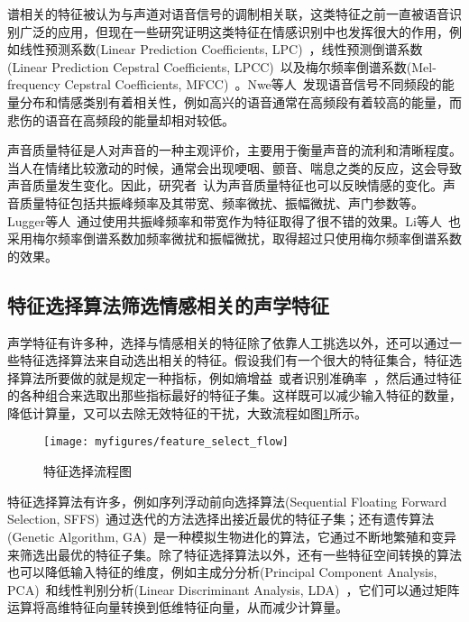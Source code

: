 谱相关的特征被认为与声道对语音信号的调制相关联，这类特征之前一直被语音识别广泛的应用，但现在一些研究证明这类特征在情感识别中也发挥很大的作用，例如线性预测系数(Linear Prediction Coefficients, LPC)~\cite{Ackroyd1997Digital}，线性预测倒谱系数(Linear Prediction Cepstral Coefficients, LPCC)~\cite{Atal1974Effectiveness}以及梅尔频率倒谱系数(Mel-frequency Cepstral Coefficients, MFCC)~\cite{Rabiner1999Fundamentals, Proakis1993Discrete}。Nwe等人~\cite{Nogueiras2012Speech}发现语音信号不同频段的能量分布和情感类别有着相关性，例如高兴的语音通常在高频段有着较高的能量，而悲伤的语音在高频段的能量却相对较低。

声音质量特征是人对声音的一种主观评价，主要用于衡量声音的流利和清晰程度。当人在情绪比较激动的时候，通常会出现哽咽、颤音、喘息之类的反应，这会导致声音质量发生变化。因此，研究者~\cite{Gobl2003The}认为声音质量特征也可以反映情感的变化。声音质量特征包括共振峰频率及其带宽、频率微扰、振幅微扰、声门参数等。Lugger等人~\cite{Lugger2007The, Lugger2008Psychological, Lugger2015Combining}通过使用共振峰频率和带宽作为特征取得了很不错的效果。Li等人~\cite{Li2007Stress}也采用梅尔频率倒谱系数加频率微扰和振幅微扰，取得超过只使用梅尔频率倒谱系数的效果。

\subsection{特征选择算法筛选情感相关的声学特征}
\label{ssec:algorithm_select}
声学特征有许多种，选择与情感相关的特征除了依靠人工挑选以外，还可以通过一些特征选择算法来自动选出相关的特征。假设我们有一个很大的特征集合，特征选择算法所要做的就是规定一种指标，例如熵增益~\cite{Dhillon2003A}或者识别准确率~\cite{Dietterich1998Approximate}，然后通过特征的各种组合来选取出那些指标最好的特征子集。这样既可以减少输入特征的数量，降低计算量，又可以去除无效特征的干扰，大致流程如图\ref{fig:feature_select_flow}所示。

\begin{figure}[htb] %
    \centering
    \texttt{[image: myfigures/feature\_select\_flow]}
    \caption{特征选择流程图}
    \label{fig:feature_select_flow}
\end{figure}

特征选择算法有许多，例如序列浮动前向选择算法(Sequential Floating Forward Selection, SFFS)~\cite{Ververidis2008Fast}通过迭代的方法选择出接近最优的特征子集；还有遗传算法(Genetic Algorithm, GA)~\cite{Yang1998Feature}是一种模拟生物进化的算法，它通过不断地繁殖和变异来筛选出最优的特征子集。除了特征选择算法以外，还有一些特征空间转换的算法也可以降低输入特征的维度，例如主成分分析(Principal Component Analysis, PCA)~\cite{Ben2003Detecting}和线性判别分析(Linear Discriminant Analysis, LDA)~\cite{Blum1997Selection}，它们可以通过矩阵运算将高维特征向量转换到低维特征向量，从而减少计算量。



